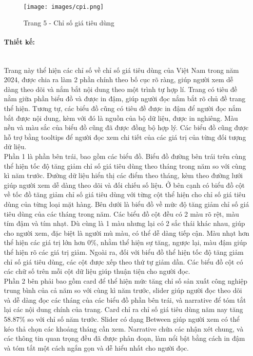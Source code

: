 \documentclass[a4paper]{report}
\begin{document}
{{\begin{figure}[H]
    \centering
    \texttt{[image: images/cpi.png]}
    \caption{Trang 5 - Chỉ số giá tiêu dùng}
    \label{fig:enter-label}
\end{figure}

\paragraph{Thiết kế: } \mbox{}\\
Trang này thể hiện các chỉ số về chỉ số giá tiêu dùng của Việt Nam trong năm 2024, được chia ra làm 2 phần chính theo bố cục rõ ràng, giúp người xem dễ dàng theo dõi và nắm bắt nội dung theo một trình tự hợp lí. Trang có tiêu đề nằm giữa phần biểu đồ và được in đậm, giúp người đọc nắm bắt rõ chủ đề trang thể hiện. Tương tự, các biểu đồ cũng có tiêu đề được in đậm để người đọc nắm bắt được nội dung, kèm với đó là nguồn của bộ dữ liệu, được in nghiêng. Màu nền và màu sắc của biểu đồ cũng đã được đồng bộ hợp lý. Các biểu đồ cũng được hỗ trợ bằng tooltips để người đọc xem chi tiết của các giá trị của từng đối tượng dữ liệu.\\
Phần 1 là phần bên trái, bao gồm các biểu đồ. Biểu đồ đường bên trái trên cùng thể hiện tốc độ tăng giảm chỉ số giá tiêu dùng theo tháng trong năm so với cùng kì năm trước. Đường dữ liệu hiển thị các điểm theo tháng, kèm theo đường lưới giúp người xem dễ dàng theo dõi và đối chiếu số liệu. Ở bên cạnh có biểu đồ cột về tốc đồ tăng giảm chỉ số giá tiêu dùng với từng cột thể hiện cho chỉ số giá tiêu dùng của từng loại mặt hàng. Bên dưới là biểu đồ về mức độ tăng giảm chỉ số giá tiêu dùng của các tháng trong năm. Các biểu đồ cột đều có 2 màu rõ rệt, màu tím đậm và tím nhạt. Dù cùng là 1 màu nhưng lại có 2 sắc thái khác nhau, giúp cho người xem, đặc biệt là người mù màu, có thể dễ dàng tiếp cận. Màu nhạt hơn thể hiện các giá trị lớn hơn 0\%, nhằm thể hiện sự tăng, ngược lại, màu đậm giúp thể hiện rõ các giá trị giảm. Ngoài ra, đối với biểu đồ thể hiện tốc độ tăng giảm chỉ số giá tiêu dùng, các cột được xếp theo thứ tự giảm dần. Các biểu đồ cột có các chữ số trên mỗi cột dữ liệu giúp thuận tiện cho người đọc.\\
Phần 2 bên phải bao gồm card để thể hiện mức tăng chỉ số sản xuất công nghiệp trung bình của cả năm so với cùng kì năm trước, slider giúp người đọc theo dõi và dễ dàng đọc các tháng của các biểu đồ phần bên trái, và narrative để tóm tắt lại các nội dung chính của trang. Card chỉ ra chỉ số giá tiêu dùng năm nay tăng 58.87\% so với chỉ số năm trước. Slider có dạng Between giúp người xem có thể kéo thả chọn các khoảng tháng cần xem. Narrative chứa các nhận xét chung, và các thông tin quan trọng đều đã được phân đoạn, làm nổi bật bằng cách in đậm và tóm tắt một cách ngắn gọn và dễ hiểu nhất cho người đọc.

}}
\end{document}
